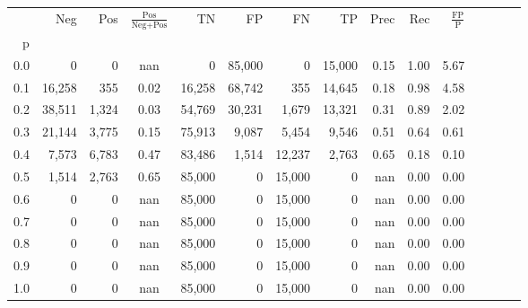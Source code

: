 \begin{tabular}{rrrcrrrrrrrrrrr}
\toprule
{} &     Neg &    Pos & $\frac{\text{Pos}}{\text{Neg}+\text{Pos}}$ &      TN &      FP &      FN &      TP &  Prec &   Rec & $\frac{\text{FP}}{\text{P}}$ \\
p   &         &        &                                            &         &         &         &         &       &       &                              \\
\midrule
0.0 &       0 &      0 &                                        nan &       0 &  85,000 &       0 &  15,000 &  0.15 &  1.00 &                         5.67 \\
0.1 &  16,258 &    355 &                                       0.02 &  16,258 &  68,742 &     355 &  14,645 &  0.18 &  0.98 &                         4.58 \\
0.2 &  38,511 &  1,324 &                                       0.03 &  54,769 &  30,231 &   1,679 &  13,321 &  0.31 &  0.89 &                         2.02 \\
0.3 &  21,144 &  3,775 &                                       0.15 &  75,913 &   9,087 &   5,454 &   9,546 &  0.51 &  0.64 &                         0.61 \\
0.4 &   7,573 &  6,783 &                                       0.47 &  83,486 &   1,514 &  12,237 &   2,763 &  0.65 &  0.18 &                         0.10 \\
0.5 &   1,514 &  2,763 &                                       0.65 &  85,000 &       0 &  15,000 &       0 &   nan &  0.00 &                         0.00 \\
0.6 &       0 &      0 &                                        nan &  85,000 &       0 &  15,000 &       0 &   nan &  0.00 &                         0.00 \\
0.7 &       0 &      0 &                                        nan &  85,000 &       0 &  15,000 &       0 &   nan &  0.00 &                         0.00 \\
0.8 &       0 &      0 &                                        nan &  85,000 &       0 &  15,000 &       0 &   nan &  0.00 &                         0.00 \\
0.9 &       0 &      0 &                                        nan &  85,000 &       0 &  15,000 &       0 &   nan &  0.00 &                         0.00 \\
1.0 &       0 &      0 &                                        nan &  85,000 &       0 &  15,000 &       0 &   nan &  0.00 &                         0.00 \\
\bottomrule
\end{tabular}
